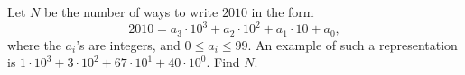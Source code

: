 Let $ N$ be the number of ways to write $ 2010$ in the form \[2010 = a_3 \cdot 10^3 + a_2 \cdot 10^2 + a_1 \cdot 10 + a_0,\]where the $ a_i$'s are integers, and $ 0 \le a_i \le 99$. An example of such a representation is $ 1\cdot10^3 + 3\cdot10^2 + 67\cdot10^1 + 40\cdot10^0$. Find $ N$.